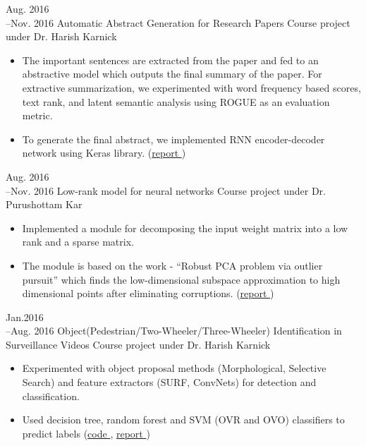 \cventry
	{Aug. 2016\\--Nov. 2016}
	{Automatic Abstract Generation for Research Papers}
	{Course project under Dr. Harish Karnick}
	{}{}
	{
		\begin{itemize}
			\item {
				The important sentences are extracted from the paper and fed to an abstractive model which outputs the final summary of the paper. 	For extractive summarization, we experimented with word frequency based scores, text rank, and latent semantic analysis using ROGUE as an evaluation metric.
			}
			\item {
				To generate the final abstract, we implemented RNN encoder-decoder network using Keras library. \hfill (\href{https://www.dropbox.com/s/h5jqpm20l8bhan6/G4-FinalReport.pdf?dl=0}{report \ExternalLink})
			}
		\end{itemize}
	}	

\cventry
	{Aug. 2016\\--Nov. 2016}
	{Low-rank model for neural networks}
	{Course project under Dr. Purushottam Kar}
	{}{}
	{
		\begin{itemize}
			\item { 
				Implemented a module for decomposing the input weight matrix into a low rank and a sparse matrix.
			}
			\item { 
				The module is based on the work - ``Robust PCA problem via outlier pursuit'' which finds the low-dimensional subspace approximation to high dimensional points after eliminating corruptions. \hfill (\href{https://www.dropbox.com/s/wb51nni96m6s1nr/Final\%20Project\%20Report.pdf?dl=0}{report \ExternalLink})
			}
		\end{itemize}
	}

\cventry
	{Jan.2016\\--Aug. 2016}
	{Object(Pedestrian/Two-Wheeler/Three-Wheeler) Identification in Surveillance Videos}
	{Course project under Dr. Harish Karnick}
	{}{}
	{
		\begin{itemize}
			\item {Experimented with object proposal methods (Morphological, Selective Search) and feature extractors (SURF, ConvNets) for detection and classification.}
			\item {Used decision tree, random forest and SVM (OVR and OVO) classifiers to predict labels \hfill (\href{https://github.com/submagr/MLT-Classifier}{code \ExternalLink}, \href{https://www.dropbox.com/s/sh69si90hl7mtxr/MLTProjectReport.pdf?dl=0}{report \ExternalLink})}
		\end{itemize}
	}